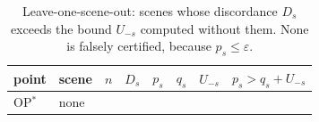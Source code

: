 \begin{table}[t]
\centering
\caption{Leave-one-scene-out: scenes whose discordance $D_s$ exceeds the bound $U_{-s}$ computed without them. None is falsely certified, because $p_s\le\varepsilon$.}
\label{tab:loso}
\scriptsize
\setlength{\tabcolsep}{3pt}
\begin{tabular}{@{}llrrrrrr@{}}
\toprule
point & scene & $n$ & $D_s$ & $p_s$ & $q_s$ & $U_{-s}$ & $p_s>q_s+U_{-s}$ \\
\midrule
OP$^\ast$ & none & & & & & & \\
\bottomrule
\end{tabular}
\end{table}
